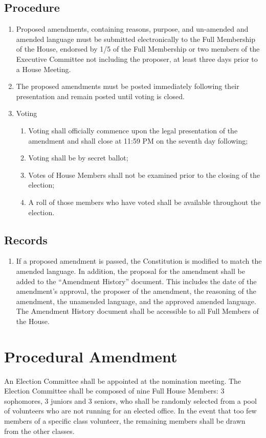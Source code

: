 \documentclass[10pt]{article} %
\begin{document}
\subsection{Procedure}
\begin{enumerate}
\item Proposed amendments, containing reasons, purpose, and un-amended and amended language must be submitted electronically to the Full Membership of the House, endorsed by 1/5 of the Full Membership or two members of the Executive Committee not including the proposer, at least three days prior to a House Meeting.
\item The proposed amendments must be posted immediately following their presentation and remain posted until voting is closed.
\item Voting
\begin{enumerate}
\item Voting shall officially commence upon the legal presentation of the amendment and shall close at 11:59 PM on the seventh day following;
\item Voting shall be by secret ballot;
\item Votes of House Members shall not be examined prior to the closing of the election;
\item A roll of those members who have voted shall be available throughout the election.
\end{enumerate}
\end{enumerate}

\subsection{Records}
\begin{enumerate}
    \item If a proposed amendment is passed, the Constitution is modified to match the amended language. In addition, the proposal for the amendment shall be added to the “Amendment History” document. This includes the date of the amendment’s approval, the proposer of the amendment, the reasoning of the amendment, the unamended language, and the approved amended language. The Amendment History document shall be accessible to all Full Members of the House.
\end{enumerate}


\pagebreak
\appendix
\section{Procedural Amendment}
\label{ProceduralAmendment}
An Election Committee shall be appointed at the nomination meeting. The Election Committee shall be composed of nine Full House Members: 3 sophomores, 3 juniors and 3 seniors, who shall be randomly selected from a pool of volunteers who are not running for an elected office. In the event that too few members of a specific class volunteer, the remaining members shall be drawn from the other classes.
\end{document}
